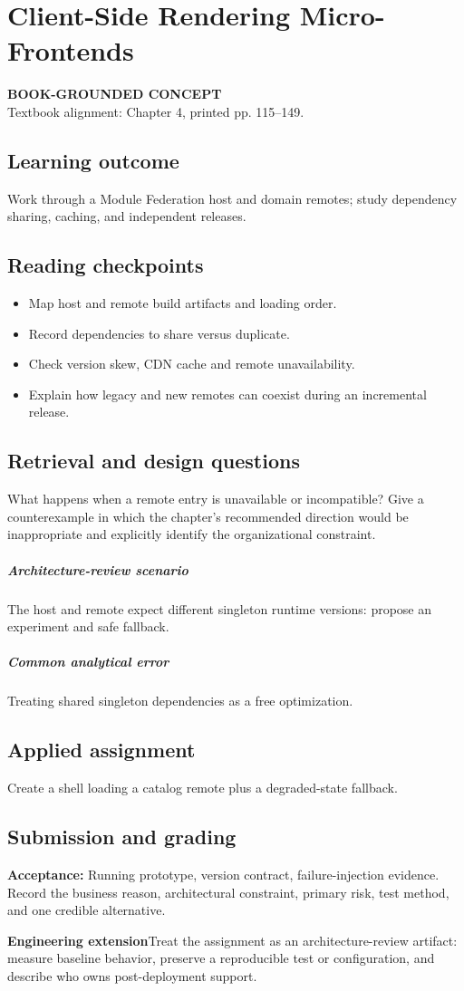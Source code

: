\documentclass[11pt,letterpaper,oneside]{report}
\newcommand{\based}[1]{\begin{sourcebox}\textbf{BOOK-GROUNDED CONCEPT}\\#1\end{sourcebox}}
\newcommand{\criterion}[1]{\textbf{Acceptance:} #1}
\begin{document}
\chapter{Client-Side Rendering Micro-Frontends}
\based{Textbook alignment: Chapter 4, printed pp. 115--149.}
\section{Learning outcome}
Work through a Module Federation host and domain remotes; study dependency sharing, caching, and independent releases.
\section{Reading checkpoints}
\begin{itemize}\item Map host and remote build artifacts and loading order.
\item Record dependencies to share versus duplicate.
\item Check version skew, CDN cache and remote unavailability.
\item Explain how legacy and new remotes can coexist during an incremental release.
\end{itemize}
\section{Retrieval and design questions}
What happens when a remote entry is unavailable or incompatible? Give a counterexample in which the chapter's recommended direction would be inappropriate and explicitly identify the organizational constraint.
\paragraph{Architecture-review scenario} The host and remote expect different singleton runtime versions: propose an experiment and safe fallback.
\paragraph{Common analytical error} Treating shared singleton dependencies as a free optimization.
\section{Applied assignment}
Create a shell loading a catalog remote plus a degraded-state fallback.
\section{Submission and grading}
\criterion{Running prototype, version contract, failure-injection evidence. Record the business reason, architectural constraint, primary risk, test method, and one credible alternative.}
\begin{engineerbox}\textbf{Engineering extension}\newline Treat the assignment as an architecture-review artifact: measure baseline behavior, preserve a reproducible test or configuration, and describe who owns post-deployment support.\end{engineerbox}
\end{document}
